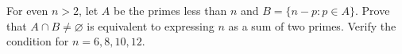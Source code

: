 For even $n>2$, let $A$ be the primes less than $n$ and $B=\{n-p:p\in A\}$. Prove that $A\cap B\ne\varnothing$ is equivalent to expressing $n$ as a sum of two primes. Verify the condition for $n=6,8,10,12$.
